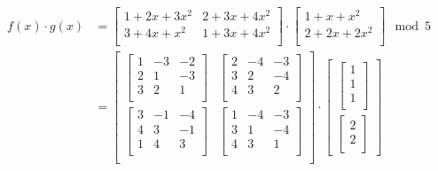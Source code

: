 \begin{align*}
  f(x) \cdot g(x) & = {
  \begin{bmatrix}
    1+2x+3x^2 & 2+3x+4x^2 \\
    3+4x+x^2  & 1+3x+4x^2 \\
  \end{bmatrix}
  \cdot
  \begin{bmatrix}
    1+x+x^2   \\
    2+2x+2x^2 \\
  \end{bmatrix}
  }                 \mod 5    \\
                  & = {
  \begin{bmatrix}
    \begin{bmatrix}
      1 & -3 & -2 \\
      2 & 1  & -3 \\
      3 & 2  & 1  \\
    \end{bmatrix} & 
    \begin{bmatrix}
      2 & -4 & -3 \\
      3 & 2  & -4 \\
      4 & 3  & 2  \\
    \end{bmatrix}   \\
    \begin{bmatrix}
      3 & -1 & -4 \\
      4 & 3  & -1 \\
      1 & 4  & 3  \\
    \end{bmatrix} & 
    \begin{bmatrix}
      1 & -4 & -3 \\
      3 & 1  & -4 \\
      4 & 3  & 1  \\
    \end{bmatrix}   \\
  \end{bmatrix}
  \cdot
  \begin{bmatrix}
    \begin{bmatrix}
      1 \\
      1 \\
      1 \\
    \end{bmatrix} \\
    \begin{bmatrix}
      2 \\
      2 \\

\end{bmatrix}
\end{bmatrix}}
\end{align*}
